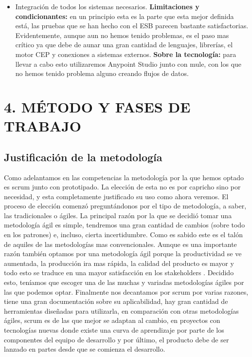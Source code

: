 \documentclass[a4paper]{article}
\begin{document}
\begin{itemize}
    \item Integración de todos los sistemas necesarios.\newline
    \textbf{Limitaciones y condicionantes:} en un principio esta es la parte que esta mejor definida está, las pruebas que se han hecho con el ESB parecen bastante satisfactorias. Evidentemente, aunque aun no hemos tenido problemas, es el paso mas crítico ya que debe de aunar una gran cantidad de lenguajes, librerías, el motor CEP y conexiones a sistemas externos.\newline
    \textbf{Sobre la tecnología:} para llevar a cabo esto utilizaremos Anypoint Studio junto con mule, con los que no hemos tenido problema alguno creando flujos de datos.

\end{itemize}
 

\section[4. M\'ETODO Y FASES DE TRABAJO]{4. M\'ETODO Y FASES DE TRABAJO}

\bigskip

\subsection{Justificación de la metodología}
Como adelantamos en las competencias la metodología por la que hemos optado es scrum junto con prototipado. La elección de esta no es por capricho sino por necesidad, y esta completamente justificado su uso como ahora veremos. El proceso de elección comenzó preguntándonos por el tipo de metodología, a saber, las tradicionales o ágiles. La principal razón por la que se decidió tomar una metodología ágil es simple, tendremos una gran cantidad de cambios (sobre todo en los patrones) e, incluso, cierta incertidumbre. Como es sabido este es el talón de aquiles de las metodologías mas convencionales. Aunque es una importante razón también optamos por una metodología ágil porque la productividad se ve aumentada, la producción ira mas rápida, la calidad del producto es mayor y todo esto se traduce en una mayor satisfacción en los stakeholders \cite{libro scrum}. Decidido esto, teníamos que escoger una de las muchas y variadas metodologías ágiles por las que podemos optar. Finalmente nos decantamos por scrum por varias razones, tiene una gran documentación sobre su aplicabilidad, hay gran cantidad de herramientas diseñadas para utilizarla, en comparación con otras metodologías ágiles, scrum es de las que mejor se adaptan al cambio, en proyectos con tecnologías nuevas donde existe una curva de aprendizaje por parte de los componentes del equipo de desarrollo y por último, el producto debe de ser lanzado en partes desde que se comienza el desarrollo.
\end{document}
